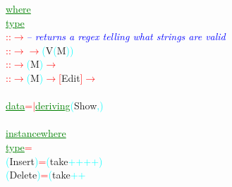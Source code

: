 \textcolor{green}{\underline{where}}\\\hstab \textcolor{green}{\underline{type}}\\\hsspace \hsspace \textcolor{red}{::}\hsspace \textcolor{red}{\ensuremath{\rightarrow}}\hsspace \textcolor{blue}{{\it{}-- returns a regex telling what strings are valid}}\\\hsspace \hsspace \textcolor{red}{::}\hsspace \textcolor{red}{\ensuremath{\rightarrow}}\hsspace \textcolor{red}{\ensuremath{\rightarrow}}\hsspace \textcolor{cyan}{(}{\rm{}V}\hsspace \textcolor{cyan}{(}{\rm{}M}\textcolor{cyan}{)}\textcolor{cyan}{)}\\\hsspace \textcolor{red}{::}\hsspace \textcolor{red}{\ensuremath{\rightarrow}}\hsspace \textcolor{cyan}{(}{\rm{}M}\textcolor{cyan}{)}\hsspace \textcolor{red}{\ensuremath{\rightarrow}}\\\hsspace \hsspace \hsspace \textcolor{red}{::}\hsspace \textcolor{red}{\ensuremath{\rightarrow}}\hsspace \textcolor{cyan}{(}{\rm{}M}\textcolor{cyan}{)}\hsspace \textcolor{red}{\ensuremath{\rightarrow}}\hsspace \textcolor{red}{[}{\rm{}Edit}\textcolor{red}{]}\hsspace \textcolor{red}{\ensuremath{\rightarrow}}\\\\\textcolor{green}{\underline{data}}\hsspace \textcolor{red}{=}\hsspace \textcolor{red}{\ensuremath{|}}\hsspace \textcolor{green}{\underline{deriving}}\hsspace \textcolor{cyan}{(}{\rm{}Show}\textcolor{cyan}{,}\textcolor{cyan}{)}\\\\\textcolor{green}{\underline{instance}}\hsspace \textcolor{green}{\underline{where}}\\\hstab \textcolor{green}{\underline{type}}\hsspace \textcolor{red}{=}\\\hsspace \textcolor{cyan}{(}{\rm{}Insert}\textcolor{cyan}{)}\hsspace \textcolor{red}{=}\hsspace \textcolor{cyan}{(}{\rm{}take}\hsspace \textcolor{cyan}{++}\hsspace \textcolor{cyan}{++}\textcolor{cyan}{)}\\\hsspace \textcolor{cyan}{(}{\rm{}Delete}\textcolor{cyan}{)}\hsspace \textcolor{red}{=}\hsspace \textcolor{cyan}{(}{\rm{}take}\hsspace \textcolor{cyan}{++}\hsspace 